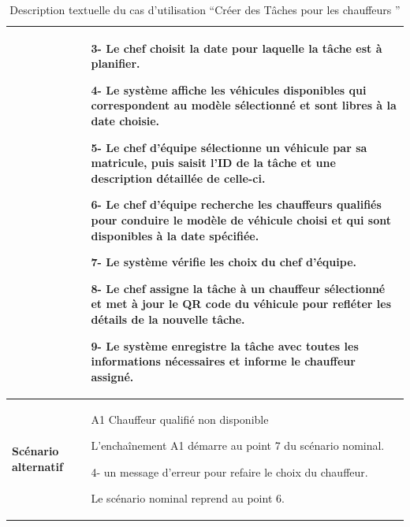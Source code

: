 \begin{table}[H]
  \centering
  \renewcommand{\arraystretch}{1.1}
  \begin{tabular}{|p{4cm}|p{9cm}|}

                                 & 3- Le chef choisit la date pour laquelle la tâche est à planifier.\newline

    4- Le système affiche les véhicules disponibles qui correspondent au modèle sélectionné et sont libres à la date choisie.\newline

    5- Le chef d'équipe sélectionne un véhicule par sa matricule, puis saisit l'ID de la tâche et une description détaillée de celle-ci. \newline

    6- Le chef d’équipe recherche les chauffeurs qualifiés pour conduire le modèle de véhicule choisi et qui sont disponibles à la date spécifiée.\newline

    7- Le système vérifie les choix du chef d’équipe.\newline

    8- Le chef assigne la tâche à un chauffeur sélectionné et met à jour le QR code du véhicule pour refléter les détails de la nouvelle tâche.\newline

    9- Le système enregistre la tâche avec toutes les informations nécessaires et informe le chauffeur assigné. \\

    \hline
    \textbf{Scénario alternatif} & A1 Chauffeur qualifié non disponible \newline

    L’enchaînement A1 démarre au point 7 du scénario nominal.\newline

    4- un message d’erreur pour refaire le choix du chauffeur.\newline

    Le scénario nominal reprend au point 6.                                                                     \\


    \hline
  \end{tabular}
  \caption{Description textuelle du cas d’utilisation “Créer des Tâches pour les chauffeurs ”}

\end{table}



